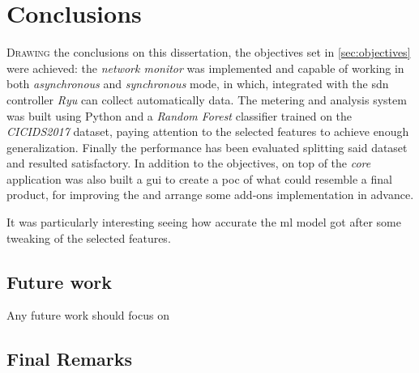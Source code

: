 \chapter{Conclusions}
\label{chap:conclusions}

\lettrine[lines=4, findent=3pt, nindent=0pt]{D}{rawing} the conclusions on this dissertation, the objectives set in \ref{sec:objectives} were achieved: the \textit{network monitor} was implemented and capable of working in both \textit{asynchronous} and \textit{synchronous} mode, in which, integrated with the \gls{sdn} controller \textit{Ryu} can collect automatically data. The metering and analysis system was built using Python and a \textit{Random Forest} classifier trained on the \textit{CICIDS2017} dataset, paying attention to the selected features to achieve enough generalization. Finally the performance has been evaluated splitting said dataset and resulted satisfactory. In addition to the objectives, on top of the \textit{core} application was also built a \gls{gui} to create a \gls{poc} of what could resemble a final product, for improving the  and arrange some add-ons implementation in advance.
\par It was particularly interesting seeing how accurate the \gls{ml} model got after some tweaking of the selected features.

\section{Future work}
\label{sec:future-work}

Any future work should focus on 
\textcolor{dimgray}{\lipsum[1-3]}

\section{Final Remarks}
\label{sec:final-remarks}

\textcolor{dimgray}{\lipsum[1]}